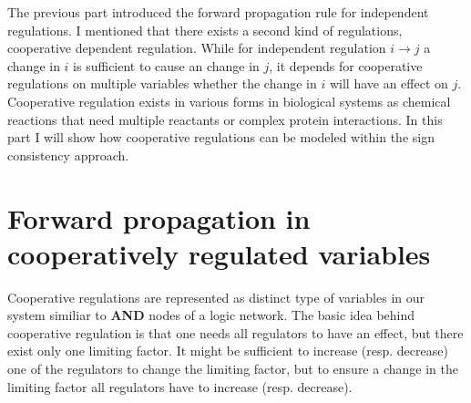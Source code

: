 The previous part introduced the forward propagation rule for independent regulations.
I mentioned that there exists a second kind of regulations, cooperative dependent regulation.
While for independent regulation $i \rightarrow j$  a change in $i$ is sufficient to cause an change in $j$,
it depends for cooperative regulations on multiple variables whether the change in $i$ will have an effect on $j$.
Cooperative regulation exists in various forms in biological systems as chemical reactions that need multiple reactants or complex protein interactions.
In this part I will show how cooperative regulations can be modeled within the sign consistency approach.


\section*{Forward propagation in cooperatively regulated variables}

Cooperative regulations are represented as distinct type of variables in our system
 similiar to {\bf AND} nodes of a logic network.
The basic idea behind cooperative regulation is that one needs all regulators to have an effect, 
 but there exist only one limiting factor.
It might be sufficient to increase (resp. decrease) one of the regulators to change the limiting factor, but
to ensure a change in the limiting factor all regulators have to increase (resp. decrease).

